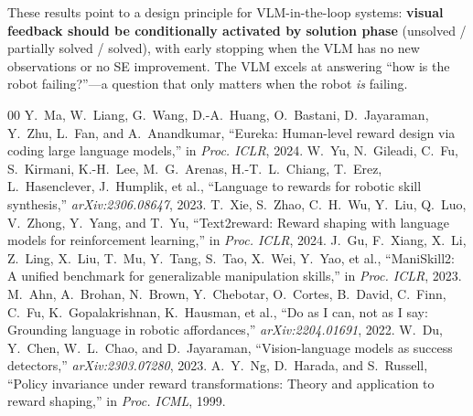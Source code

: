 \documentclass[conference]{IEEEtran}
\begin{document}
These results point to a design principle for VLM-in-the-loop systems:
\textbf{visual feedback should be conditionally activated by solution phase}
(unsolved / partially solved / solved), with early stopping when the VLM has no
new observations or no SE improvement.
The VLM excels at answering ``how is the robot failing?''---a question that only
matters when the robot \emph{is} failing.



\begin{thebibliography}{00}
 Y.~Ma, W.~Liang, G.~Wang, D.-A.~Huang, O.~Bastani,
  D.~Jayaraman, Y.~Zhu, L.~Fan, and A.~Anandkumar, ``Eureka: Human-level
  reward design via coding large language models,'' in \emph{Proc. ICLR}, 2024.
 W.~Yu, N.~Gileadi, C.~Fu, S.~Kirmani, K.-H.~Lee, M.~G.~Arenas,
  H.-T.~L.~Chiang, T.~Erez, L.~Hasenclever, J.~Humplik, et al.,
  ``Language to rewards for robotic skill synthesis,'' \emph{arXiv:2306.08647}, 2023.
 T.~Xie, S.~Zhao, C.~H.~Wu, Y.~Liu, Q.~Luo, V.~Zhong,
  Y.~Yang, and T.~Yu, ``Text2reward: Reward shaping with language models for
  reinforcement learning,'' in \emph{Proc. ICLR}, 2024.
 J.~Gu, F.~Xiang, X.~Li, Z.~Ling, X.~Liu, T.~Mu,
  Y.~Tang, S.~Tao, X.~Wei, Y.~Yao, et al., ``ManiSkill2: A unified benchmark
  for generalizable manipulation skills,'' in \emph{Proc. ICLR}, 2023.
 M.~Ahn, A.~Brohan, N.~Brown, Y.~Chebotar, O.~Cortes,
  B.~David, C.~Finn, C.~Fu, K.~Gopalakrishnan, K.~Hausman, et al., ``Do as I
  can, not as I say: Grounding language in robotic affordances,''
  \emph{arXiv:2204.01691}, 2022.
 W.~Du, Y.~Chen, W.~L.~Chao, and D.~Jayaraman,
  ``Vision-language models as success detectors,'' \emph{arXiv:2303.07280}, 2023.
 A.~Y.~Ng, D.~Harada, and S.~Russell, ``Policy invariance under
  reward transformations: Theory and application to reward shaping,'' in
  \emph{Proc. ICML}, 1999.
\end{thebibliography}
\end{document}

